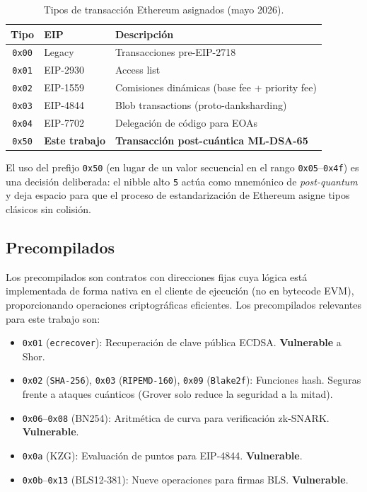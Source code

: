 \begin{table}[htbp]
\centering
\caption{Tipos de transacción Ethereum asignados (mayo 2026).}
\label{tab:tx_types}
\begin{tabular}{@{}cll@{}}
\toprule
\textbf{Tipo} & \textbf{EIP} & \textbf{Descripción} \\
\midrule
\texttt{0x00} & Legacy & Transacciones pre-EIP-2718 \\
\texttt{0x01} & EIP-2930 & Access list \\
\texttt{0x02} & EIP-1559 & Comisiones dinámicas (base fee + priority fee) \\
\texttt{0x03} & EIP-4844 & Blob transactions (proto-danksharding) \\
\texttt{0x04} & EIP-7702 & Delegación de código para EOAs \\
\texttt{0x50} & \textbf{Este trabajo} & \textbf{Transacción post-cuántica ML-DSA-65} \\
\bottomrule
\end{tabular}
\end{table}

El uso del prefijo \texttt{0x50} (en lugar de un valor secuencial en el rango \texttt{0x05}--\texttt{0x4f}) es una decisión deliberada: el nibble alto \texttt{5} actúa como mnemónico de \emph{post-quantum} y deja espacio para que el proceso de estandarización de Ethereum asigne tipos clásicos sin colisión.

\subsection{Precompilados}

Los precompilados son contratos con direcciones fijas cuya lógica está implementada de forma nativa en el cliente de ejecución (no en bytecode EVM), proporcionando operaciones criptográficas eficientes. Los precompilados relevantes para este trabajo son:

\begin{itemize}
  \item \texttt{0x01} (\texttt{ecrecover}): Recuperación de clave pública ECDSA. \textbf{Vulnerable} a Shor.
  \item \texttt{0x02} (\texttt{SHA-256}), \texttt{0x03} (\texttt{RIPEMD-160}), \texttt{0x09} (\texttt{Blake2f}): Funciones hash. Seguras frente a ataques cuánticos (Grover solo reduce la seguridad a la mitad).
  \item \texttt{0x06}--\texttt{0x08} (BN254): Aritmética de curva para verificación zk-SNARK. \textbf{Vulnerable}.
  \item \texttt{0x0a} (KZG): Evaluación de puntos para EIP-4844. \textbf{Vulnerable}.
  \item \texttt{0x0b}--\texttt{0x13} (BLS12-381): Nueve operaciones para firmas BLS. \textbf{Vulnerable}.
\end{itemize}


